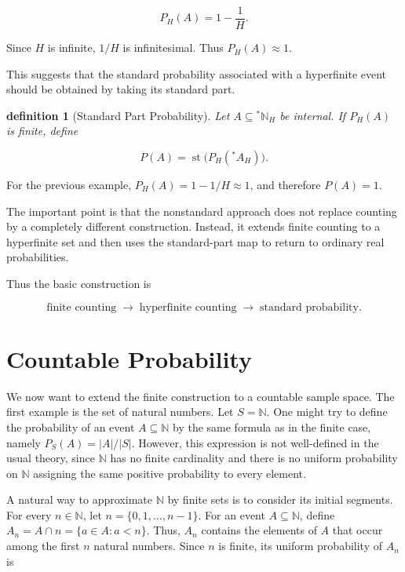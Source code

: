 \documentclass[10pt,a4paper]{book}
\newtheorem{definition}{definition}[section]
\begin{document}
$$
    P_H(A)=1-\frac1H.
$$

Since $H$ is infinite, $1/H$ is infinitesimal. Thus $P_H(A)\approx1$.

This suggests that the standard probability associated with a hyperfinite event should be obtained by taking its standard part.

\begin{definition}[Standard Part Probability]
    Let $A\subseteq {}^*\mathbb{N}_H$ be internal. If $P_H(A)$ is finite, define

    $$
        P(A)=\operatorname{st}\bigl(P_H({}^*A_H)\bigr).
    $$

\end{definition}

For the previous example, $P_H(A)=1-1/H\approx1$, and therefore $P(A)=1$.

The important point is that the nonstandard approach does not replace counting by a completely different construction. Instead, it extends finite counting to a hyperfinite set and then uses the standard-part map to return to ordinary real probabilities.

Thus the basic construction is

$$
    \text{finite counting}
    \;\longrightarrow\;
    \text{hyperfinite counting}
    \;\longrightarrow\;
    \text{standard probability}.
$$

\section{Countable Probability}

We now want to extend the finite construction to a countable sample space. The first example is the set of natural numbers. Let $S=\mathbb{N}$. One might try to define the probability of an event $A\subseteq\mathbb{N}$ by the same formula as in the finite case, namely $P_S(A)=|A|/|S|$. However, this expression is not well-defined in the usual theory, since $\mathbb{N}$ has no finite cardinality and there is no uniform probability on $\mathbb{N}$ assigning the same positive probability to every element.

A natural way to approximate $\mathbb{N}$ by finite sets is to consider its initial segments. For every $n\in\mathbb{N}$, let $
    n=\{0,1,\ldots,n-1\}.
$ For an event $A\subseteq\mathbb{N}$, define $
    A_n=A\cap n=\{a\in A:a<n\}.
$
Thus, $A_n$ contains the elements of $A$ that occur among the first $n$ natural numbers. Since $n$ is finite, its uniform probability of $A_n$ is
\end{document}
